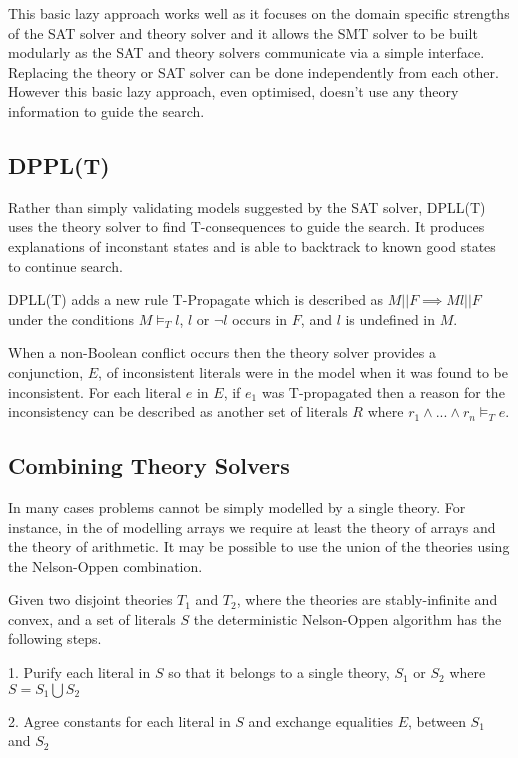 \documentclass[]{final_report}
\begin{document}
This basic lazy approach works well as it focuses on the domain specific strengths of the SAT solver and theory solver and it allows the SMT solver to be built modularly as the SAT and theory solvers communicate via a simple interface. Replacing the theory or SAT solver can be done independently from each other. However this basic lazy approach, even optimised, doesn't use any theory information to guide the search. ~\cite{sattosmt}

\subsection{DPPL(T)}
Rather than simply validating models suggested by the SAT solver, DPLL(T) uses the theory solver to find T-consequences to guide the search. It produces explanations of inconstant states and is able to backtrack to known good states to continue search. ~\cite{smtdpplt} ~\cite{ganzinger2004dpll}

DPLL(T) adds a new rule T-Propagate which is described as $M || F \implies M l || F $ under the conditions $M \models _T l$, $l$ or $\lnot l$ occurs in $F$, and $l$ is undefined in $M$.  ~\cite{sattosmt}

When a non-Boolean conflict occurs then the theory solver provides a conjunction, $E$, of inconsistent literals were in the model when it was found to be inconsistent.  For each literal $e $ in $E$, if $e_1$ was T-propagated then a reason for the inconsistency can be described as another set of literals $R$ where $r_1 \land ... \land r_n \models _T e$. 

\subsection{Combining Theory Solvers}
In many cases problems cannot be simply modelled by a single theory. For instance, in the of modelling arrays we require at least the theory of arrays and the theory of arithmetic. It may be possible to use the union of the theories using the Nelson-Oppen combination. ~\cite{smtdpplt}

Given two disjoint theories $T_1$ and $T_2$, where the theories are stably-infinite and convex, and a set of literals $S$ the deterministic Nelson-Oppen algorithm has the following steps.

1. Purify each literal in $S$ so that it belongs to a single theory, $S_1$ or $S_2$ where $S = S_1 \bigcup S_2$

2. Agree constants for each literal in $S$ and exchange equalities $E$, between $S_1$ and $S_2$
\end{document}
